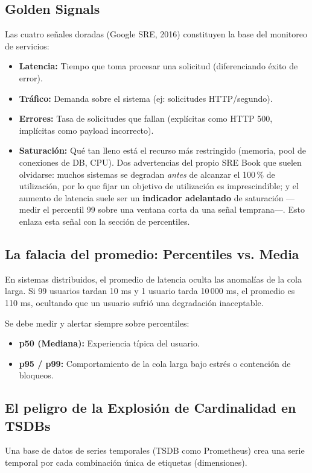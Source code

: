 \documentclass[variant=apuntes,cover=institutional,mode=screen]{ua-engineering-v6-article}
\begin{document}
\subsection{Golden Signals}
Las cuatro señales doradas (Google SRE, 2016) constituyen la base del monitoreo de servicios:
\begin{itemize}
\item \textbf{Latencia:} Tiempo que toma procesar una solicitud (diferenciando éxito de error).
\item \textbf{Tráfico:} Demanda sobre el sistema (ej: solicitudes HTTP/segundo).
\item \textbf{Errores:} Tasa de solicitudes que fallan (explícitas como HTTP 500, implícitas como payload incorrecto).
\item \textbf{Saturación:} Qué tan lleno está el recurso más restringido (memoria, pool de conexiones de DB, CPU). Dos advertencias del propio SRE Book que suelen olvidarse: muchos sistemas se degradan \emph{antes} de alcanzar el 100\,\% de utilización, por lo que fijar un objetivo de utilización es imprescindible; y el aumento de latencia suele ser un \textbf{indicador adelantado} de saturación ---medir el percentil 99 sobre una ventana corta da una señal temprana---. Esto enlaza esta señal con la sección de percentiles.
\end{itemize}

\subsection{La falacia del promedio: Percentiles vs. Media}
En sistemas distribuidos, el promedio de latencia oculta las anomalías de la cola larga. Si 99 usuarios tardan 10 ms y 1 usuario tarda 10\,000 ms, el promedio es 110 ms, ocultando que un usuario sufrió una degradación inaceptable.

Se debe medir y alertar siempre sobre percentiles:
\begin{itemize}
\item \textbf{p50 (Mediana):} Experiencia típica del usuario.
\item \textbf{p95 / p99:} Comportamiento de la cola larga bajo estrés o contención de bloqueos.
\end{itemize}

\subsection{El peligro de la Explosión de Cardinalidad en TSDBs}
Una base de datos de series temporales (TSDB como Prometheus) crea una serie temporal por cada combinación única de etiquetas (dimensiones).
\end{document}
